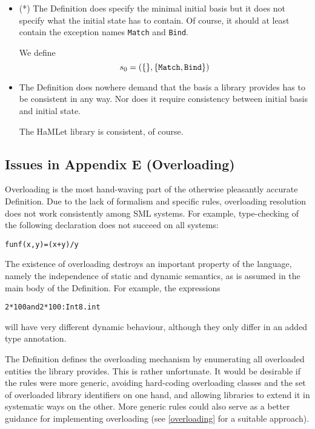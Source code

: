 \documentclass[twoside,titlepage]{article}
\begin{document}
\begin{appendix}
\begin{itemize}

\item (*) The Definition does specify the minimal initial basis but it does not specify what the initial state has to contain. Of course, it should at least contain the exception names {\tt Match} and {\tt Bind}.

We define
%
\begin{displaymath}
s_0 = (\{\}, \{{\tt Match}, {\tt Bind}\})
\end{displaymath}
%
\item The Definition does nowhere demand that the basis a library provides has to be consistent in any way. Nor does it require consistency between initial basis and initial state.

The HaMLet library is consistent, of course.
\end{itemize}


\subsection{Issues in Appendix E (Overloading)}
\label{bugsappendixe}

Overloading is the most hand-waving part of the otherwise pleasantly accurate Definition. Due to the lack of formalism and specific rules, overloading resolution does not work consistently among SML systems. For example, type-checking of the following declaration does not succeed on all systems:

\begin{quoting}
\begin{alltt}
fun f(x, y) = (x + y)/y
\end{alltt}
\end{quoting}

The existence of overloading destroys an important property of the language, namely the independence of static and dynamic semantics, as is assumed in the main body of the Definition. For example, the expressions

\begin{quoting}
\begin{alltt}
2 * 100    {\rm and}    2 * 100 : Int8.int
\end{alltt}
\end{quoting}

will have very different dynamic behaviour, although they only differ in an added type annotation.

The Definition defines the overloading mechanism by enumerating all overloaded entities the library provides. This is rather unfortunate. It would be desirable if the rules were more generic, avoiding hard-coding overloading classes and the set of overloaded library identifiers on one hand, and allowing libraries to extend it in systematic ways on the other. More generic rules could also serve as a better guidance for implementing overloading (see \ref{overloading} for a suitable approach).


\end{appendix}
\end{document}
